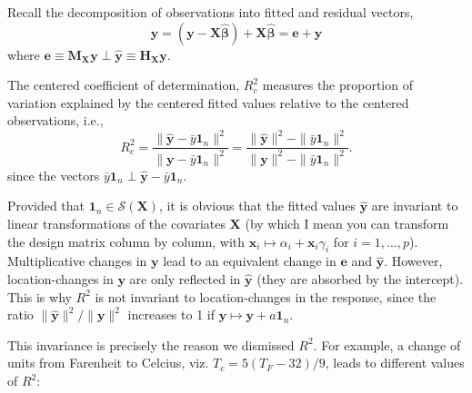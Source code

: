 \documentclass[]{book}
\theoremstyle{definition}
\theoremstyle{definition}
\theoremstyle{definition}
\theoremstyle{remark}
\begin{document}
Recall the decomposition of observations into fitted and residual
vectors,
\[\boldsymbol{y} = (\boldsymbol{y} - \mathbf{X}\hat{\boldsymbol{\beta}}) + \mathbf{X}\hat{\boldsymbol{\beta}}= \boldsymbol{e} + \hat{\boldsymbol{y}}\]
where
\(\boldsymbol{e} \equiv \mathbf{M}_{\mathbf{X}}\boldsymbol{y} \perp \hat{\boldsymbol{y}} \equiv \mathbf{H}_{\mathbf{X}}\boldsymbol{y}\).

The centered coefficient of determination, \(R^2_c\) measures the
proportion of variation explained by the centered fitted values relative
to the centered observations, i.e.,
\[ R^2_c = \frac{\|\hat{\boldsymbol{y}}-\bar{y}\mathbf{1}_n\|^2}{\|\boldsymbol{y}-\bar{y}\mathbf{1}_n\|^2}=\frac{\|\hat{\boldsymbol{y}}\|^2-\|\bar{y}\mathbf{1}_n\|^2}{\|\boldsymbol{y}\|^2-\|\bar{y}\mathbf{1}_n\|^2}.\]
since the vectors
\(\bar{y}\mathbf{1}_n \perp \hat{\boldsymbol{y}}-\bar{y}\mathbf{1}_n\).

Provided that \(\mathbf{1}_n \in \mathscr{S}(\mathbf{X})\), it is
obvious that the fitted values \(\hat{\boldsymbol{y}}\) are invariant to
linear transformations of the covariates \(\mathbf{X}\) (by which I mean
you can transform the design matrix column by column, with
\(\mathbf{x}_i \mapsto \alpha_i+\mathbf{x}_i\gamma_i\) for
\(i=1, \ldots, p\)). Multiplicative changes in \(\boldsymbol{y}\) lead
to an equivalent change in \(\boldsymbol{e}\) and
\(\hat{\boldsymbol{y}}\). However, location-changes in
\(\boldsymbol{y}\) are only reflected in \(\hat{\boldsymbol{y}}\) (they
are absorbed by the intercept). This is why \(R^2\) is not invariant to
location-changes in the response, since the ratio
\(\|\hat{\boldsymbol{y}}\|^2/\|\boldsymbol{y}\|^2\) increases to 1 if
\({\boldsymbol{y}}\mapsto {\boldsymbol{y}}+ a \mathbf{1}_n\).

This invariance is precisely the reason we dismissed \(R^2\). For
example, a change of units from Farenheit to Celcius, viz.
\(T_c = 5 (T_F - 32)/9\), leads to different values of \(R^2\):
\end{document}
